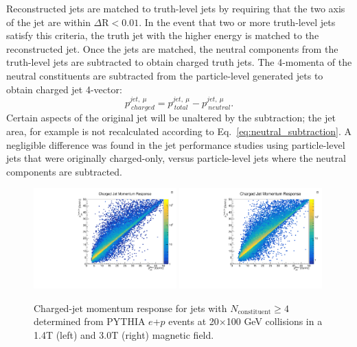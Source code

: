 Reconstructed jets are matched to truth-level jets by requiring that the two axis of the jet are within $\Delta\mathrm{R} < 0.01$. In the event that two or more truth-level jets satisfy this criteria, the truth jet with the higher energy is matched to the reconstructed jet.
%
Once the jets are matched, the neutral components from the truth-level jets are subtracted to obtain charged truth jets. 
The 4-momenta of the neutral constituents are subtracted from the particle-level generated jets to obtain charged jet 4-vector:
\begin{equation}
\label{eq:neutral_subtraction}
p^{{jet, \ }\mu}_{\mathrm \ charged} = p^{{jet, \ }\mu}_{\mathrm \ total}  - p^{{jet, \ }\mu}_{\mathrm \ neutral}.
\end{equation}
%
Certain aspects of the original jet will be unaltered by the subtraction; the jet area, for example is not recalculated according to Eq.~\ref{eq:neutral_subtraction}. 
A negligible difference was found in the jet performance studies using particle-level jets that were originally charged-only, versus particle-level jets where the neutral components are subtracted.

\begin{figure}[htbp]
    \centering
    \includegraphics[width=0.49\textwidth]{EIC_Jets/1.4T_momentum_response.pdf}
    \includegraphics[width=0.49\textwidth]{EIC_Jets/3T_momentum_response.pdf}
    \caption{Charged-jet momentum response for jets with $N_\mathrm{constituent} \geq 4$ determined from PYTHIA $e$+$p$ events at 20$\times$100 GeV collisions in a 1.4T (left) and 3.0T (right) magnetic field.}
    \label{fig:jet_response}
\end{figure}


